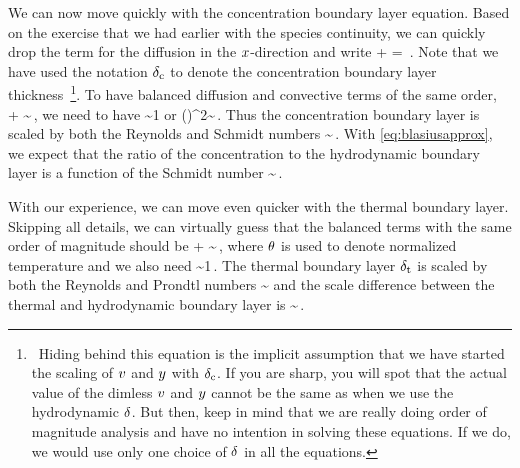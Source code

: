 We can now move quickly with the concentration boundary layer equation. Based on the exercise that we had earlier with the species continuity, we can quickly drop the term for the diffusion in the $x$-direction and write
\beq
\ndvelx\xpd\conc\ndposx + \ndvely\xpd\conc\ndposy = \conc\ndposy\,.
\eeq
Note that we have used the notation $\delta_\text{c}$ to denote the concentration boundary layer thickness~\footnote{~Hiding behind this equation is the implicit assumption that we have started the scaling of $v$ and $y$ with $\delta_\text{c}$. If you are sharp, you will spot that the actual value of the dimless $v$ and $y$ cannot be the same as when we use the hydrodynamic $\delta$. But then, keep in mind that we are really doing order of magnitude analysis and have no intention in solving these equations. If we do, we would use only one choice of $\delta$ in all the equations.}. To have balanced diffusion and convective terms of the same order,
\bneq\label{eq:balanceddiffusionconvection}
\ndvelx\xpd\conc\ndposx + \ndvely\xpd\conc\ndposy \sim{}\conc\ndposy\,,
\eneq
we need to have
\beq
{}\sim 1
\eeq
or
\beq
\left(\dfrac{\cblthck}{\length}\right)^2\sim{}\,.
\eeq
Thus the concentration boundary layer is scaled by both the Reynolds and Schmidt numbers
\beq
\dfrac{\cblthck}{\length}\sim{}\,.
\eeq
With \cref{eq:blasiusapprox}, we expect that the ratio of the concentration to the hydrodynamic boundary layer is a function of the Schmidt number
\bneq\label{eq:ratioconchydroboundarylayers}
\dfrac{\cblthck}{\blthck}\sim{}\,.
\eneq

With our experience, we can move even quicker with the thermal boundary layer. Skipping all details, we can virtually guess that the balanced terms with the same order of magnitude should be
\beq
\ndvelx\xpd\ndtemp\ndposx + \ndvely\xpd\ndtemp\ndposy \sim {}\ndtemp\ndposy\,,
\eeq
where $\theta$ is used to denote normalized temperature and we also need
\beq
{}\sim 1\,.
\eeq
The thermal boundary layer $\delta_\text{t}$ is scaled by both the Reynolds and Prondtl numbers
\beq
\dfrac{\tblthck}{\length}\sim{}
\eeq
and the scale difference between the thermal and hydrodynamic boundary layer is
\bneq\label{eq:ratiothermalhydroboundarylayers}
\dfrac{\tblthck}{\blthck}\sim{}\,.
\eneq

